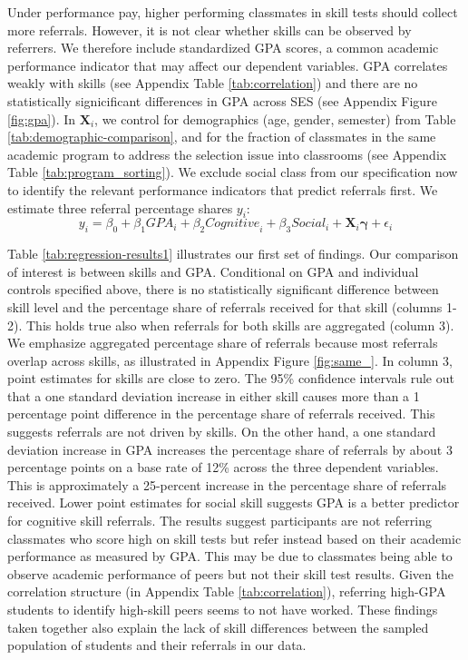 \documentclass[11pt,a4paper,oneside]{article}
\begin{document}
Under performance pay, higher performing classmates in skill tests should collect more referrals. However, it is not clear whether skills can be observed by referrers. We therefore include standardized GPA scores, a common academic performance indicator that may affect our dependent variables. GPA correlates weakly with skills (see Appendix Table \ref{tab:correlation}) and there are no statistically signicificant differences in GPA across SES (see Appendix Figure \ref{fig:gpa}). In $\mathbf{X}_{i}$, we control for demographics (age, gender, semester) from Table \ref{tab:demographic-comparison}, and for the fraction of classmates in the same academic program to address the selection issue into classrooms (see Appendix Table \ref{tab:program_sorting}). We exclude social class from our specification now to identify the relevant performance indicators that predict referrals first. We estimate three referral percentage shares $y_{i}$: 
\begin{equation}\label{eq1}
    y_{i} = \beta_0 + \beta_1{GPA}_{i} + \beta_2{Cognitive}_{i} + \beta_3{Social}_{i} + \mathbf{X}_{i}\boldsymbol{\gamma} + \epsilon_{i}    
\end{equation}

Table \ref{tab:regression-results1} illustrates our first set of findings. Our comparison of interest is between skills and GPA. Conditional on GPA and individual controls specified above, there is no statistically significant difference between skill level and the percentage share of referrals received for that skill (columns 1-2). This holds true also when referrals for both skills are aggregated (column 3). We emphasize aggregated percentage share of referrals because most referrals overlap across skills, as illustrated in Appendix Figure \ref{fig:same_}. In column 3, point estimates for skills are close to zero. The 95\% confidence intervals rule out that a one standard deviation increase in either skill causes more than a 1 percentage point difference in the percentage share of referrals received. This suggests referrals are not driven by skills. On the other hand, a one standard deviation increase in GPA increases the percentage share of referrals by about 3 percentage points on a base rate of 12\% across the three dependent variables. This is approximately a 25-percent increase in the percentage share of referrals received. Lower point estimates for social skill suggests GPA is a better predictor for cognitive skill referrals. The results suggest participants are not referring classmates who score high on skill tests but refer instead based on their academic performance as measured by GPA. This may be due to classmates being able to observe academic performance of peers but not their skill test results. Given the correlation structure (in Appendix Table \ref{tab:correlation}), referring high-GPA students to identify high-skill peers seems to not have worked. These findings taken together also explain the lack of skill differences between the sampled population of students and their referrals in our data.
\end{document}
